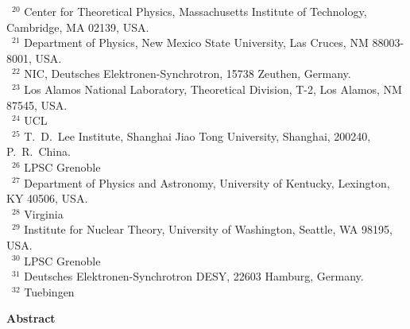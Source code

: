 \documentclass[11pt,a4paper]{article}
\numberwithin{equation}{section}
\numberwithin{figure}{section}
\numberwithin{table}{section}
\begin{document}
\begin{center}
{~$^{20}$ Center for Theoretical Physics, Massachusetts Institute of Technology, Cambridge, MA 02139, USA. \\
~$^{21}$ Department of Physics, New Mexico State University, Las Cruces, NM 88003-8001, USA. \\
~$^{22}$ NIC, Deutsches Elektronen-Synchrotron, 15738 Zeuthen, Germany.\\
~$^{23}$ Los Alamos National Laboratory, Theoretical Division, T-2, Los Alamos, NM 87545, USA. \\
~$^{24}$ UCL \\
~$^{25}$ T.~D.~Lee Institute, Shanghai Jiao Tong University, Shanghai, 200240, P.~R.~China. \\
~$^{26}$ LPSC Grenoble \\
~$^{27}$ Department of Physics and Astronomy, University of Kentucky, Lexington, KY 40506, USA. \\
~$^{28}$ Virginia \\
~$^{29}$ Institute for Nuclear Theory, University of Washington, Seattle, WA 98195, USA. \\
~$^{30}$ LPSC Grenoble \\
~$^{31}$ Deutsches Elektronen-Synchrotron DESY, 22603 Hamburg, Germany. \\
~$^{32}$ Tuebingen \\
}

\clearpage

{\bf \large Abstract}


\end{center}
\end{document}
